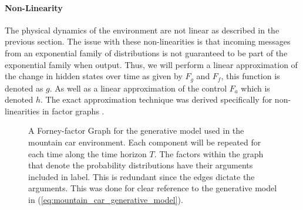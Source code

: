 \documentclass{article}
\newcommand{\refp}[1]{(\ref{#1})}
\begin{document}
\paragraph{Non-Linearity} The physical dynamics of the environment are not linear as described in the previous section. The issue with these non-linearities is that incoming messages from an exponential family of distributions is not guaranteed to be part of the exponential family when output. \citep{van2019simulating} Thus, we will perform a linear approximation of the change in hidden states over time as given by $F_g$ and $F_f$, this function is denoted as $g$. As well as a linear approximation of the control $F_a$ which is denoted $h$. The exact approximation technique was derived specifically for non-linearities in factor graphs \citep{petersen2018approximate}. 

\begin{figure}[h]
    \centering
{}
\caption{A Forney-factor Graph for the generative model used in the mountain car environment. Each component will be repeated for each time along the time horizon $T$. The factors within the graph that denote the probability distributions have their arguments included in label. This is redundant since the edges dictate the arguments. This was done for clear reference to the generative model in \refp{eq:mountain_car_generative_model}.}
\label{fig:online_ai_ffg}
\end{figure}
\end{document}
